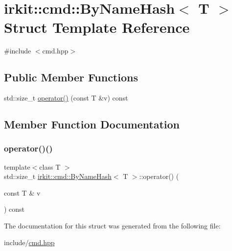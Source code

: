 \hypertarget{structirkit_1_1cmd_1_1ByNameHash}{}\section{irkit\+:\+:cmd\+:\+:By\+Name\+Hash$<$ T $>$ Struct Template Reference}
\label{structirkit_1_1cmd_1_1ByNameHash}


{\ttfamily \#include $<$cmd.\+hpp$>$}

\subsection*{Public Member Functions}
\begin{DoxyCompactItemize}
\item 
std\+::size\+\_\+t \mbox{\hyperlink{structirkit_1_1cmd_1_1ByNameHash_ada3825d0d232bc6d45becd3ac39d7652}{operator()}} (const T \&v) const
\end{DoxyCompactItemize}


\subsection{Member Function Documentation}
\mbox{\label{structirkit_1_1cmd_1_1ByNameHash_ada3825d0d232bc6d45becd3ac39d7652}} 
\subsubsection{\texorpdfstring{operator()()}{operator()()}}
{\footnotesize\ttfamily template$<$class T $>$ \\
std\+::size\+\_\+t \mbox{\hyperlink{structirkit_1_1cmd_1_1ByNameHash}{irkit\+::cmd\+::\+By\+Name\+Hash}}$<$ T $>$\+::operator() (\begin{DoxyParamCaption}\item[{const T \&}]{v }\end{DoxyParamCaption}) const\hspace{0.3cm}{\ttfamily [inline]}}



The documentation for this struct was generated from the following file\+:\begin{DoxyCompactItemize}
\item 
include/\mbox{\hyperlink{cmd_8hpp}{cmd.\+hpp}}\end{DoxyCompactItemize}
